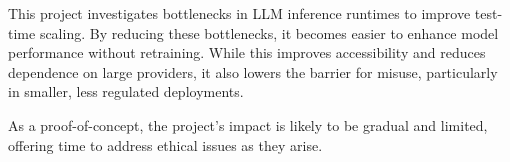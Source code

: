 \documentclass[12pt,twoside]{report}
\begin{document}
This project investigates bottlenecks in LLM inference runtimes to improve test-time scaling. 
By reducing these bottlenecks, it becomes easier to enhance model performance without retraining. 
While this improves accessibility and reduces dependence on large providers, it also lowers the barrier for misuse, particularly in smaller, less regulated deployments.

As a proof-of-concept, the project’s impact is likely to be gradual and limited, offering time to address ethical issues as they arise.
\end{document}
